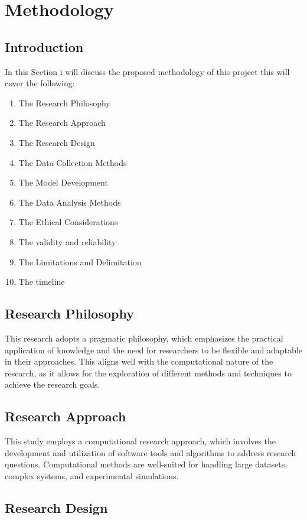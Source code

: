 \section{Methodology}
\subsection{Introduction}
In this  Section  i will discuss the  proposed  methodology of this  project this will cover the  following:
\begin{enumerate}
    \item The Research Philosophy
    \item The Research Approach
    \item The Research Design
    \item The Data Collection Methods
    \item The Model Development
    \item The Data Analysis Methods
    \item The Ethical Considerations
    \item The validity and reliability 
    \item The Limitations and Delimitation
    \item The timeline
\end{enumerate} 
\subsection{Research Philosophy}

This research adopts a pragmatic philosophy, which emphasizes the practical application of knowledge and the need for researchers to be flexible and adaptable in their approaches. This aligns well with the computational nature of the research, as it allows for the exploration of different methods and techniques to achieve the research goals.

\subsection{Research Approach}

This study employs a computational research approach, which involves the development and utilization of software tools and algorithms to address research questions. Computational methods are well-suited for handling large datasets, complex systems, and experimental simulations.

\subsection{Research Design}


